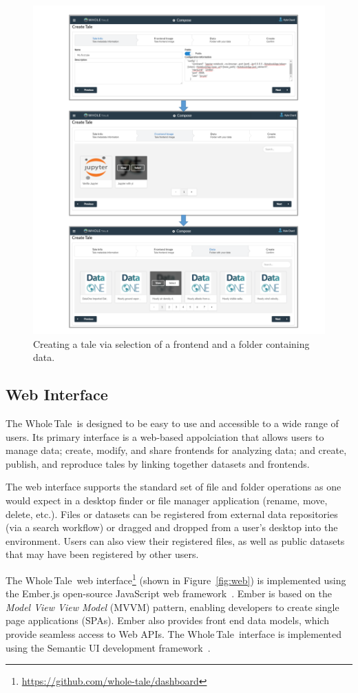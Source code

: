 \documentclass{elsarticle}
\newcommand{\wt}{Whole\,Tale}
\begin{document}
\begin{figure}[ht!]
\centering
  \includegraphics[trim=0in 0in 0in 0in,clip,width=0.75\columnwidth]{tale-creation.pdf}
\caption{Creating a tale via selection of a frontend and a folder containing data. \label{fig:creation}}
\end{figure}


\subsection{Web Interface}

The \wt\ is designed to be easy to use and accessible
to a wide range of users. Its primary interface is
a web-based appolciation that allows users to manage data; create, modify, and share frontends for analyzing data; and 
create, publish, and reproduce tales by linking together datasets
and frontends. 

The web interface supports the standard set of file and folder operations  as one would expect in a desktop finder or file manager application (rename, move, delete, etc.). 
Files or datasets can be registered
from external data repositories (via a search workflow) or dragged and dropped from a user's desktop into the environment. Users can also view their registered files, as well as public datasets that may have been registered by other users. 
 
The \wt\ web interface\footnote{\url{https://github.com/whole-tale/dashboard}} 
(shown in Figure~\ref{fig:web}) is implemented using the 
Ember.js open-source JavaScript web framework~\cite{emberjs}. Ember is based on the \emph{Model View View Model} (MVVM) pattern, enabling developers to create single page applications (SPAs). 
Ember also provides front end data models, which provide seamless access to Web APIs. The \wt\ interface is implemented using the Semantic UI development framework~\cite{semantic-ui}. 
\end{document}
